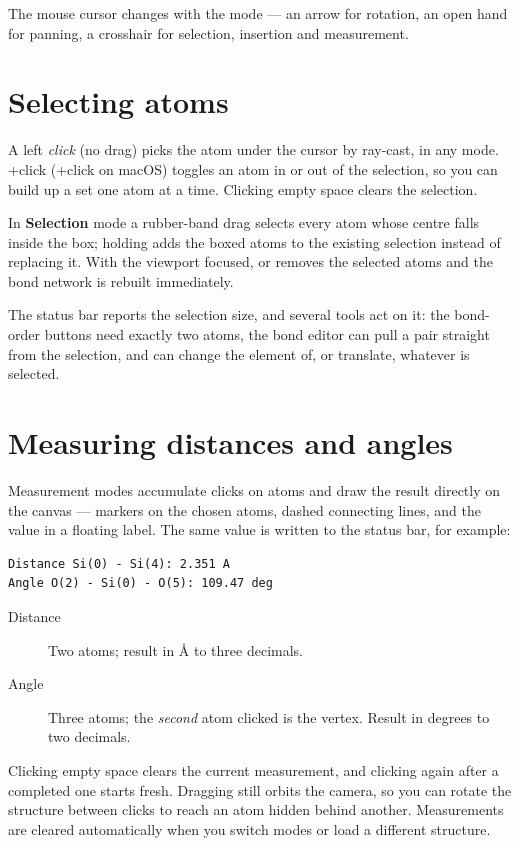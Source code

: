 The mouse cursor changes with the mode --- an arrow for rotation, an open
hand for panning, a crosshair for selection, insertion and measurement.

\section{Selecting atoms}

A left \emph{click} (no drag) picks the atom under the cursor by ray-cast,
in any mode. +click (+click on macOS) toggles an atom in
or out of the selection, so you can build up a set one atom at a time.
Clicking empty space clears the selection.

In \textbf{Selection} mode a rubber-band drag selects every atom whose
centre falls inside the box; holding  adds the boxed atoms to the
existing selection instead of replacing it. With the viewport focused,
 or  removes the selected atoms and the bond
network is rebuilt immediately.

The status bar reports the selection size, and several tools act on it: the
bond-order buttons need exactly two atoms, the bond editor can pull a pair
straight from the selection, and \menusep{} can
change the element of, or translate, whatever is selected.

\section{Measuring distances and angles}
\label{sec:measure}

Measurement modes accumulate clicks on atoms and draw the result directly
on the canvas --- markers on the chosen atoms, dashed connecting lines, and
the value in a floating label. The same value is written to the status bar,
for example:

\begin{lstlisting}
Distance Si(0) - Si(4): 2.351 A
Angle O(2) - Si(0) - O(5): 109.47 deg
\end{lstlisting}

\begin{description}
  \item[Distance] Two atoms; result in \AA{} to three decimals.
  \item[Angle] Three atoms; the \emph{second} atom clicked is the vertex.
    Result in degrees to two decimals.
\end{description}

Clicking empty space clears the current measurement, and clicking again
after a completed one starts fresh. Dragging still orbits the camera, so
you can rotate the structure between clicks to reach an atom hidden behind
another. Measurements are cleared automatically when you switch modes or
load a different structure.

